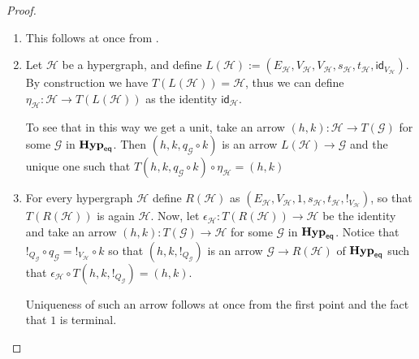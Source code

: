 \documentclass[3p]{elsarticle}
\newcommand{\catname}[1]{\textbf{\textup{#1}}}
\newcommand{\EqHyp}{\catname{Hyp}_{\mathsf{eq}}} %
\newcommand{\id}[1]{\mathsf{id}_{#1}}
\theoremstyle{remark}
\theoremstyle{definition}
\begin{document}
\begin{proof}\label{proof:forghyp}
	\begin{enumerate}
		\item  This follows at once from .
		\item  	Let $\mathcal{H}$ be a hypergraph, and define $L(\mathcal{H}) := (E_\mathcal{H}, V_{\mathcal{H}}, V_{\mathcal{H}}, s_\mathcal{H}, t_\mathcal{H}, \id{V_\mathcal{H}})$.  By construction we have $T(L(\mathcal{H}))=\mathcal{H}$, thus we can define
		$\eta_\mathcal{H}\colon \mathcal{H}\to T(L(\mathcal{H}))$ as the identity $\id{\mathcal{H}}$. 
		
		To see that in this way we get a unit,  take an arrow $(h, k)\colon \mathcal{H}\to T(\mathcal{G})$ for some $\mathcal{G}$ in $\EqHyp$. Then $(h,k, q_{\mathcal{G}}\circ k)$ is an arrow $L(\mathcal{H})\to \mathcal{G}$ and the unique one such that $T(h,k, q_{\mathcal{G}}\circ k)\circ \eta_{\mathcal{H}}=(h,k)$
		
		\item For every hypergraph $\mathcal{H}$ define $R(\mathcal{H})$ as $(E_\mathcal{H}, V_{\mathcal{H}}, 1, s_\mathcal{H}, t_\mathcal{H}, !_{V_\mathcal{H}})$, so that $T(R(\mathcal{H}))$ is again $\mathcal{H}$.  Now, let $\epsilon_{\mathcal{H}}\colon T(R(\mathcal{H}))\to \mathcal{H}$ be the identity and take an arrow $(h,k)\colon T(\mathcal{G})\to \mathcal{H}$ for some $\mathcal{G}$ in $\EqHyp$.  Notice that $!_{Q_\mathcal{G}}\circ q_{\mathcal{G}}=!_{V_{\mathcal{H}}}\circ k$
		so that $(h,k, !_{Q_\mathcal{G}})$ is an arrow $\mathcal{G}\to R(\mathcal{H})$ of $\EqHyp$ such that $\epsilon_{\mathcal{H}}\circ T(h,k, !_{Q_\mathcal{G}})=(h,k)$.
		
		Uniqueness of such an arrow follows at once from the first point and the fact that $1$ is terminal. \qedhere 
	\end{enumerate}
\end{proof}
\end{document}
